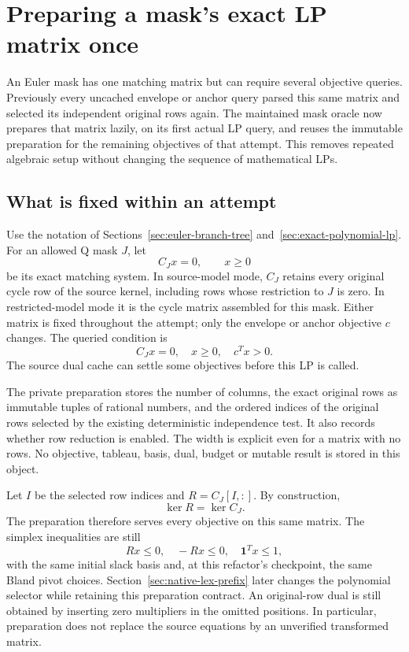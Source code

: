 \section{Preparing a mask's exact LP matrix once}
\label{sec:prepared-euler-matrix}

An Euler mask has one matching matrix but can require several objective
queries.  Previously every uncached envelope or anchor query parsed this
same matrix and selected its independent original rows again.  The
maintained mask oracle now prepares that matrix lazily, on its first
actual LP query, and reuses the immutable preparation for the remaining
objectives of that attempt.  This removes repeated algebraic setup without
changing the sequence of mathematical LPs.

\subsection{What is fixed within an attempt}

Use the notation of Sections~\ref{sec:euler-branch-tree}
and~\ref{sec:exact-polynomial-lp}.  For an allowed Q mask $J$, let
\[
                C_J x=0,\qquad x\ge0
\]
be its exact matching system.  In source-model mode, $C_J$ retains every
original cycle row of the source kernel, including rows whose restriction
to $J$ is zero.  In restricted-model mode it is the cycle matrix assembled
for this mask.  Either matrix is fixed throughout the attempt; only the
envelope or anchor objective $c$ changes.  The queried condition is
\[
                  C_Jx=0,\quad x\ge0,\quad c^Tx>0.
\]
The source dual cache can settle some objectives before this LP is called.

The private preparation stores the number of columns, the exact original
rows as immutable tuples of rational numbers, and the ordered indices of
the original rows selected by the existing deterministic independence
test.  It also records whether row reduction is enabled.  The width is
explicit even for a matrix with no rows.  No objective, tableau, basis,
dual, budget or mutable result is stored in this object.

Let $I$ be the selected row indices and $R=C_J[I,:]$.  By construction,
\[
                   \ker R=\ker C_J.
\]
The preparation therefore serves every objective on this same matrix.
The simplex inequalities are still
\[
                Rx\le0,\quad -Rx\le0,\quad \mathbf1^Tx\le1,
\]
with the same initial slack basis and, at this refactor's checkpoint,
the same Bland pivot choices.  Section~\ref{sec:native-lex-prefix} later
changes the polynomial selector while retaining this preparation contract.
An original-row dual is still obtained by inserting zero multipliers in
the omitted positions.  In particular, preparation does not replace the
source equations by an unverified transformed matrix.

